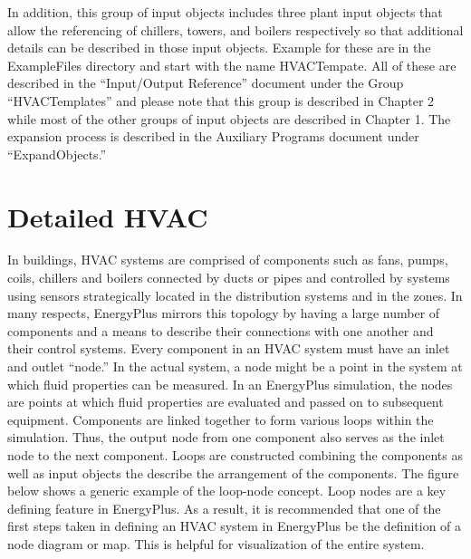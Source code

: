 In addition, this group of input objects includes three plant input
objects that allow the referencing of chillers, towers, and boilers
respectively so that additional details can be described in those
input objects. Example for these are in the ExampleFiles directory
and start with the name HVACTempate. All of these are described in
the \textquotedblleft Input/Output Reference\textquotedblright{} document
under the Group \textquotedblleft HVACTemplates\textquotedblright{}
and please note that this group is described in Chapter 2 while most
of the other groups of input objects are described in Chapter 1. The
expansion process is described in the Auxiliary Programs document
under \textquotedblleft ExpandObjects.\textquotedblright{}

\section{Detailed HVAC}

In buildings, HVAC systems are comprised of components such as fans,
pumps, coils, chillers and boilers connected by ducts or pipes and
controlled by systems using sensors strategically located in the distribution
systems and in the zones. In many respects, EnergyPlus mirrors this
topology by having a large number of components and a means to describe
their connections with one another and their control systems. Every
component in an HVAC system must have an inlet and outlet \textquotedblleft node.\textquotedblright{}
In the actual system, a node might be a point in the system at which
fluid properties can be measured. In an EnergyPlus simulation, the
nodes are points at which fluid properties are evaluated and passed
on to subsequent equipment. Components are linked together to form
various loops within the simulation. Thus, the output node from one
component also serves as the inlet node to the next component. Loops
are constructed combining the components as well as input objects
the describe the arrangement of the components. The figure below shows
a generic example of the loop-node concept. Loop nodes are a key defining
feature in EnergyPlus. As a result, it is recommended that one of
the first steps taken in defining an HVAC system in EnergyPlus be
the definition of a node diagram or map. This is helpful for visualization
of the entire system.

